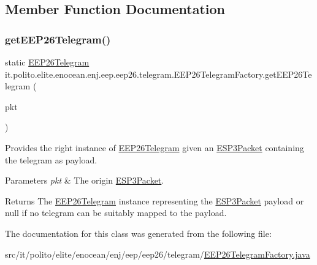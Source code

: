 \subsection{Member Function Documentation}
\hypertarget{classit_1_1polito_1_1elite_1_1enocean_1_1enj_1_1eep_1_1eep26_1_1telegram_1_1_e_e_p26_telegram_factory_a8024e4162ca2a609f3ac501eafdf728a}{}\label{classit_1_1polito_1_1elite_1_1enocean_1_1enj_1_1eep_1_1eep26_1_1telegram_1_1_e_e_p26_telegram_factory_a8024e4162ca2a609f3ac501eafdf728a} 
\subsubsection{\texorpdfstring{get\+E\+E\+P26\+Telegram()}{getEEP26Telegram()}}
{\footnotesize\ttfamily static \hyperlink{classit_1_1polito_1_1elite_1_1enocean_1_1enj_1_1eep_1_1eep26_1_1telegram_1_1_e_e_p26_telegram}{E\+E\+P26\+Telegram} it.\+polito.\+elite.\+enocean.\+enj.\+eep.\+eep26.\+telegram.\+E\+E\+P26\+Telegram\+Factory.\+get\+E\+E\+P26\+Telegram (\begin{DoxyParamCaption}\item[{\hyperlink{classit_1_1polito_1_1elite_1_1enocean_1_1protocol_1_1serial_1_1v3_1_1network_1_1packet_1_1_e_s_p3_packet}{E\+S\+P3\+Packet}}]{pkt }\end{DoxyParamCaption})\hspace{0.3cm}{\ttfamily [static]}}

Provides the right instance of \hyperlink{classit_1_1polito_1_1elite_1_1enocean_1_1enj_1_1eep_1_1eep26_1_1telegram_1_1_e_e_p26_telegram}{E\+E\+P26\+Telegram} given an \hyperlink{}{E\+S\+P3\+Packet} containing the telegram as payload.


\begin{DoxyParams}{Parameters}
{\em pkt} & The origin \hyperlink{}{E\+S\+P3\+Packet}. \\
\hline
\end{DoxyParams}
\begin{DoxyReturn}{Returns}
The \hyperlink{classit_1_1polito_1_1elite_1_1enocean_1_1enj_1_1eep_1_1eep26_1_1telegram_1_1_e_e_p26_telegram}{E\+E\+P26\+Telegram} instance representing the \hyperlink{}{E\+S\+P3\+Packet} payload or null if no telegram can be suitably mapped to the payload. 
\end{DoxyReturn}


The documentation for this class was generated from the following file\+:\begin{DoxyCompactItemize}
\item 
src/it/polito/elite/enocean/enj/eep/eep26/telegram/\hyperlink{_e_e_p26_telegram_factory_8java}{E\+E\+P26\+Telegram\+Factory.\+java}\end{DoxyCompactItemize}

